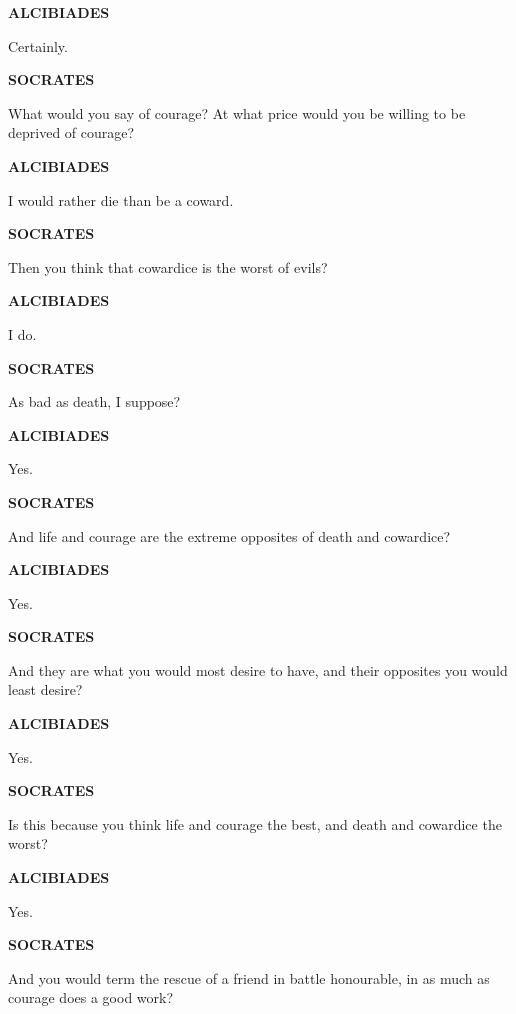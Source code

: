 \documentclass[11pt,letter]{article}
\begin{document}
\par \textbf{ALCIBIADES}
\par   Certainly.

\par \textbf{SOCRATES}
\par   What would you say of courage? At what price would you be willing to be deprived of courage?

\par \textbf{ALCIBIADES}
\par   I would rather die than be a coward.

\par \textbf{SOCRATES}
\par   Then you think that cowardice is the worst of evils?

\par \textbf{ALCIBIADES}
\par   I do.

\par \textbf{SOCRATES}
\par   As bad as death, I suppose?

\par \textbf{ALCIBIADES}
\par   Yes.

\par \textbf{SOCRATES}
\par   And life and courage are the extreme opposites of death and cowardice?

\par \textbf{ALCIBIADES}
\par   Yes.

\par \textbf{SOCRATES}
\par   And they are what you would most desire to have, and their opposites you would least desire?

\par \textbf{ALCIBIADES}
\par   Yes.

\par \textbf{SOCRATES}
\par   Is this because you think life and courage the best, and death and cowardice the worst?

\par \textbf{ALCIBIADES}
\par   Yes.

\par \textbf{SOCRATES}
\par   And you would term the rescue of a friend in battle honourable, in as much as courage does a good work?
\end{document}

